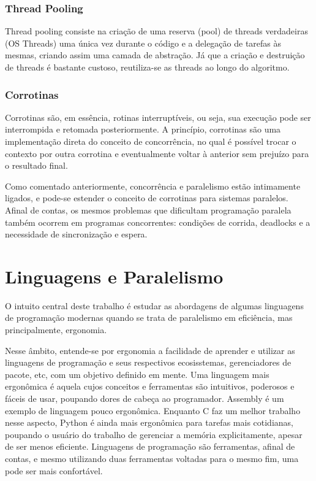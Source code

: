\documentclass{article}
\begin{document}
\subsubsection{Thread Pooling}
\label{sssec:thread pooling}

Thread pooling consiste na criação de uma reserva (pool) de threads verdadeiras (OS Threads) uma única vez durante o código e a delegação de tarefas às mesmas, criando assim uma camada de abstração. Já que a criação e destruição de threads é bastante custoso, reutiliza-se as threads ao longo do algoritmo.

\subsubsection{Corrotinas}
\label{sssec:corrotina}

Corrotinas são, em essência, rotinas interruptíveis, ou seja, sua execução pode ser interrompida e retomada posteriormente. A princípio, corrotinas são uma implementação direta do conceito de concorrência, no qual é possível trocar o contexto por outra corrotina e eventualmente voltar à anterior sem prejuízo para o resultado final.

Como comentado anteriormente, concorrência e paralelismo estão intimamente ligados, e pode-se estender o conceito de corrotinas para sistemas paralelos. Afinal de contas, os mesmos problemas que dificultam programação paralela também ocorrem em programas concorrentes: condições de corrida, deadlocks e a necessidade de sincronização e espera.

\section{Linguagens e Paralelismo}
\label{sec:linguagens paralelismo}

O intuito central deste trabalho é estudar as abordagens de algumas linguagens de programação modernas quando se trata de paralelismo em eficiência, mas principalmente, ergonomia.

Nesse âmbito, entende-se por ergonomia a facilidade de aprender e utilizar as linguagens de programação e seus respectivos ecosisstemas, gerenciadores de pacote, etc, com um objetivo definido em mente. Uma linguagem mais ergonômica é aquela cujos conceitos e ferramentas são intuitivos, poderosos e fáceis de usar, poupando dores de cabeça ao programador. Assembly é um exemplo de linguagem pouco ergonômica. Enquanto C faz um melhor trabalho nesse aspecto, Python é ainda mais ergonômica para tarefas mais cotidianas, poupando o usuário do trabalho de gerenciar a memória explicitamente, apesar de ser menos eficiente. Linguagens de programação são ferramentas, afinal de contas, e mesmo utilizando duas ferramentas voltadas para o mesmo fim, uma pode ser mais confortável.
\end{document}
